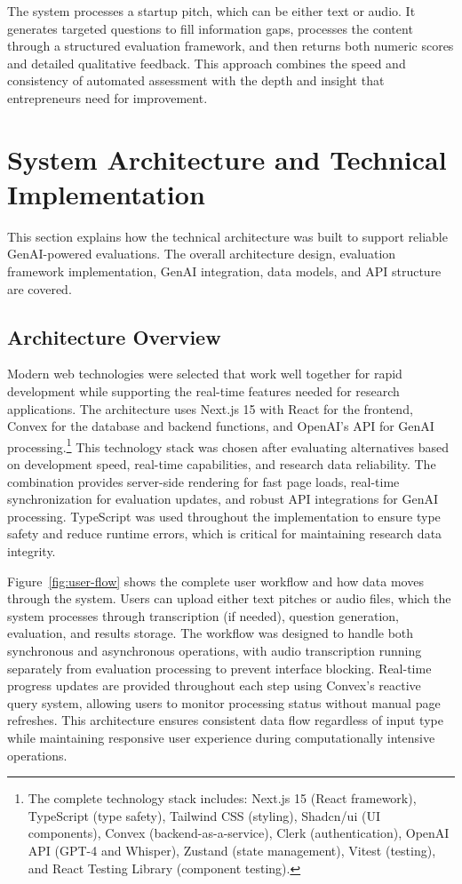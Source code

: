 The system processes a startup pitch, which can be either text or audio. It generates targeted questions to fill information gaps, processes the content through a structured evaluation framework, and then returns both numeric scores and detailed qualitative feedback. This approach combines the speed and consistency of automated assessment with the depth and insight that entrepreneurs need for improvement.

\section{System Architecture and Technical Implementation} \label{sec:system-design}

This section explains how the technical architecture was built to support reliable GenAI-powered evaluations. The overall architecture design, evaluation framework implementation, GenAI integration, data models, and API structure are covered.

\subsection{Architecture Overview}\label{subsec:architecture-overview}

Modern web technologies were selected that work well together for rapid development while supporting the real-time features needed for research applications. The architecture uses Next.js 15 with React for the frontend, Convex for the database and backend functions, and OpenAI's API for GenAI processing.\footnote{The complete technology stack includes: Next.js 15 (React framework), TypeScript (type safety), Tailwind CSS (styling), Shadcn/ui (UI components), Convex (backend-as-a-service), Clerk (authentication), OpenAI API (GPT-4 and Whisper), Zustand (state management), Vitest (testing), and React Testing Library (component testing).} This technology stack was chosen after evaluating alternatives based on development speed, real-time capabilities, and research data reliability. The combination provides server-side rendering for fast page loads, real-time synchronization for evaluation updates, and robust API integrations for GenAI processing. TypeScript was used throughout the implementation to ensure type safety and reduce runtime errors, which is critical for maintaining research data integrity.

Figure~\ref{fig:user-flow} shows the complete user workflow and how data moves through the system. Users can upload either text pitches or audio files, which the system processes through transcription (if needed), question generation, evaluation, and results storage. The workflow was designed to handle both synchronous and asynchronous operations, with audio transcription running separately from evaluation processing to prevent interface blocking. Real-time progress updates are provided throughout each step using Convex's reactive query system, allowing users to monitor processing status without manual page refreshes. This architecture ensures consistent data flow regardless of input type while maintaining responsive user experience during computationally intensive operations.

